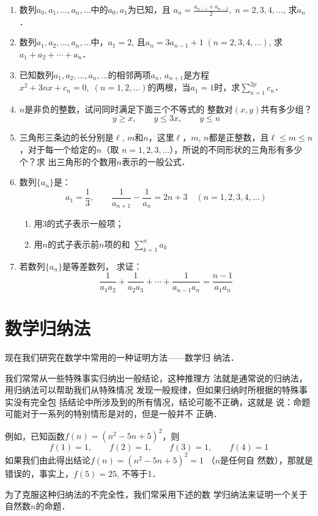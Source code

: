 \begin{enumerate}
\item 数列$a_0,a_1,\ldots, a_n,\ldots$中的$a_0,a_1$为已知，且
$a_n=\frac{a_{n-1}+a_{n-2}}{2},\; n=2,3,4,\ldots$, 求$a_n$．

\item 数列$a_1,a_2,\ldots,a_n,\ldots$中，$a_1=2$, 且$a_n=3a_{n-1}+1\; (n=2,3,4,\ldots )$, 求$a_1+a_2+\cdots +a_n$．
\item 已知数列$a_1,a_2,\ldots ,a_n,\ldots$的相邻两项$a_n$,
$a_{n+1}$是方程$x^2+3nx+c_n=0,\; (n=1,2,\ldots)$的两根，当$a_1=
1$时，求$\sum^{2p}_{n=1}c_n$．
\item $n$是非负的整数，试问同时满足下面三个不等式的
整数对$(x,y)$共有多少组？
\[y\ge x,\qquad y\le 3x,\qquad y\le n\]
\item 三角形三条边的长分别是$\ell$, $m$和$n$，这里$\ell$，$m$,
$n$都是正整数，且$\ell\le m\le n$，对于每一个给定的$n$（取
$n=1,2,3,\ldots$），所说的不同形状的三角形有多少个？求
出三角形的个数用$n$表示的一般公式．
\item 数列$\{a_n\}$是：
\[a_1=\frac{1}{3},\qquad \frac{1}{a_{n+1}}-\frac{1}{a_n}=2n+3\quad (n=1,2,3,4,\ldots)\]
\begin{enumerate}
    \item 用3的式子表示一般项；
    \item 用$n$的式子表示前$n$项的和 $\displaystyle\sum^n_{k=1}a_k$
\end{enumerate}

\item 若数列$\{a_n\}$是等差数列，
求证：\[\frac{1}{a_1a_2}+\frac{1}{a_2a_3}+\cdots+\frac{1}{a_{n-1}a_n}=\frac{n-1}{a_1a_n}\]
\end{enumerate}

\section{数学归纳法}
现在我们研究在数学中常用的一种证明方法——数学归
纳法．

我们常常从一些特殊事实归纳出一般结论，这种推理方
法就是通常说的归纳法，用归纳法可以帮助我们从特殊情况
发现一般规律，但如果归纳时所根据的特殊事实没有完全包
括结论中所涉及到的所有情况，结论可能不正确，这就是
说：命题可能对于一系列的特别情形是对的，但是一般并不
正确．

例如，已知函数$f(n)=(n^2-5n+5)^2$，则
\[f(1)=1,\qquad f(2)=1,\qquad f(3)=1,\qquad f(4)=1 \]
如果我们由此得出结论$f(n)=(n^2-5n+5)^2=1$ （$n$是任何自
然数），那就是错误的，事实上，$f(5)=25$, 不等于1．

为了克服这种归纳法的不完全性，我们常采用下述的数
学归纳法来证明一个关于自然数$n$的命题．

